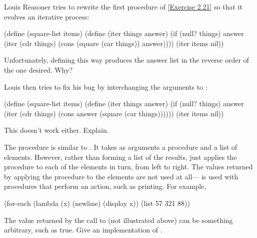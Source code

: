 \begin{exercise}
	\label{Exercise 2.22}
	Louis Reasoner tries to rewrite the first  procedure of \cref{Exercise 2.21} so that it evolves an iterative process:
	\begin{scheme}
	  (define (square-list items)
	    (define (iter things answer)
	      (if (null? things)
	          answer
	          (iter (cdr things)
	                (cons (square (car things))
	                      answer))))
	    (iter items nil))
	\end{scheme}
	Unfortunately, defining  this way produces the answer list in the reverse order of the one desired.
	Why?

	Louis then tries to fix his bug by interchanging the arguments to :
	\begin{scheme}
	  (define (square-list items)
	    (define (iter things answer)
	      (if (null? things)
	          answer
	          (iter (cdr things)
	                (cons answer
	                      (square (car things))))))
	    (iter items nil))
	\end{scheme}
	This doesn’t work either.
	Explain.
\end{exercise}



\begin{exercise}
	\label{Exercise 2.23}
	The procedure  is similar to .
	It takes as arguments a procedure and a list of elements.
	However, rather than forming a list of the results,  just applies the procedure to each of the elements in turn, from left to right.
	The values returned by applying the procedure to the elements are not used at all--- is used with procedures that perform an action, such as printing.
	For example,
	\begin{scheme}
	  (for-each (lambda (x)
	              (newline)
	              (display x))
	            (list 57 321 88))
	  ~~
	  ~~
	  ~~
	\end{scheme}
	The value returned by the call to  (not illustrated above) can be something arbitrary, such as true.
	Give an implementation of .
\end{exercise}
